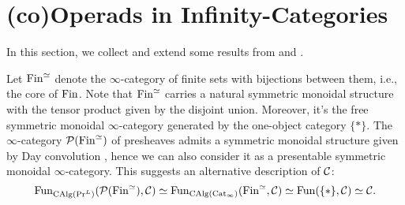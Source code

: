 \section{(co)Operads in Infinity-Categories}
\label{(co)Operads in Infinity-Categories}
In this section, we collect and extend some results from \cite{BrantnerPhD} and \cite{Hadrianphdthesis}.

Let $\operatorname{Fin}^{\simeq}$ denote the $\infty$-category of finite sets with bijections between them, i.e., the core of $\operatorname{Fin}$. 
Note that $\operatorname{Fin}^{\simeq}$ carries a natural symmetric monoidal structure with the tensor product given by the disjoint union. 
Moreover, it's the free symmetric monoidal $\infty$-category generated by the one-object category $\{*\}$.
The $\infty$-category ${\mathcal{P}}(\operatorname{Fin}^{\simeq})$ of presheaves admits a symmetric monoidal structure given by Day convolution \cite[Example 2.2.6.9.]{HA}, hence we can also consider it as a presentable symmetric monoidal $\infty$-category. This suggests an alternative description of ${\mathcal{C}}$:
\[
\operatorname{Fun}_{\operatorname{CAlg}(\Pr^L)}({\mathcal{P}}(\operatorname{Fin}^{\simeq}), {\mathcal{C}}) 
\simeq 
\operatorname{Fun}_{\operatorname{CAlg}(\operatorname{Cat}_{\infty})} (\operatorname{Fin}^{\simeq}, {\mathcal{C}})
\simeq
\operatorname{Fun}(\{*\}, {\mathcal{C}})
\simeq 
{\mathcal{C}}.
\]


